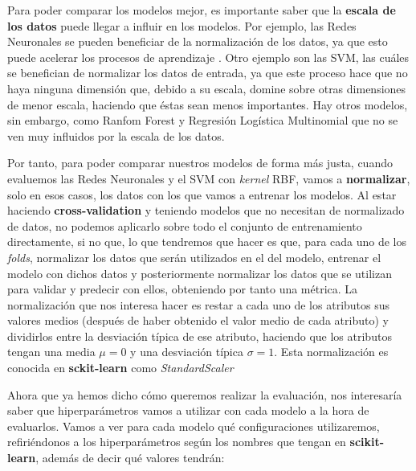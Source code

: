 \documentclass[11pt,a4paper]{article}
\begin{document}
Para poder comparar los modelos mejor, es importante saber que la \textbf{escala de los datos} puede llegar a influir en los modelos. Por ejemplo,
las Redes Neuronales se pueden beneficiar de la normalización de los datos, ya que esto puede acelerar los procesos de aprendizaje
\cite{bib:normalize}. Otro ejemplo son las SVM, las cuáles se benefician de normalizar los datos de entrada, ya que este proceso hace
que no haya ninguna dimensión que, debido a su escala, domine sobre otras dimensiones de menor escala, haciendo que éstas sean menos importantes.
Hay otros modelos, sin embargo, como Ranfom Forest y Regresión Logística Multinomial que no se ven muy influidos por la escala de los datos.

Por tanto, para poder comparar nuestros modelos de forma más justa, cuando evaluemos las Redes Neuronales y el SVM con \textit{kernel} RBF, vamos
a \textbf{normalizar}, solo en esos casos, los datos con los que vamos a entrenar los modelos. Al estar haciendo \textbf{cross-validation} y teniendo
modelos que no necesitan de normalizado de datos, no podemos aplicarlo sobre todo el conjunto de entrenamiento directamente, si no que, lo que
tendremos que hacer es que, para cada uno de los \textit{folds}, normalizar los datos que serán utilizados en el del modelo, entrenar el modelo
con dichos datos y posteriormente normalizar los datos que se utilizan para validar y predecir con ellos, obteniendo por tanto una métrica.
La normalización que nos interesa hacer es restar a cada uno de los atributos sus valores medios (después de haber obtenido el valor medio de
cada atributo) y dividirlos entre la desviación típica de ese atributo, haciendo que los atributos tengan una media $\mu = 0$ y una desviación
típica $\sigma = 1$. Esta normalización es conocida en \textbf{sckit-learn} como \textit{StandardScaler}\cite{scaler}

Ahora que ya hemos dicho cómo queremos realizar la evaluación, nos interesaría saber que hiperparámetros vamos a utilizar con cada modelo a la
hora de evaluarlos. Vamos a ver para cada modelo qué configuraciones utilizaremos, refiriéndonos a los hiperparámetros según los nombres que
tengan en \textbf{scikit-learn}, además de decir qué valores tendrán:
\end{document}
